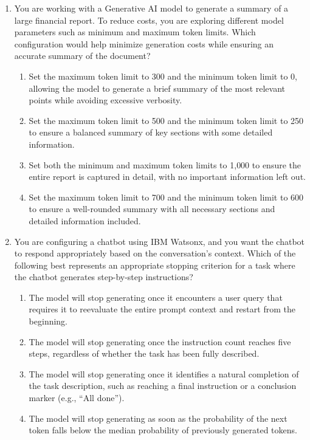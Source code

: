 \begin{enumerate}[leftmargin=*]
\begin{enumerate}[label=\Alph*.]
  \item Use simple, concise instructions that avoid ambiguity but ensure all necessary constraints are included.
  \item Focus on minimal prompts to reduce computational load, even if it sacrifices some clarity.
  \item Create longer, detailed prompts that cover all edge cases to reduce the need for multiple training iterations.
\end{enumerate}
\item You are working with a Generative AI model to generate a summary of a large financial report. To reduce costs, you are exploring different model parameters such as minimum and maximum token limits. Which configuration would help minimize generation costs while ensuring an accurate summary of the document?
\begin{enumerate}[label=\Alph*.]
  \item Set the maximum token limit to 300 and the minimum token limit to 0, allowing the model to generate a brief summary of the most relevant points while avoiding excessive verbosity.
  \item Set the maximum token limit to 500 and the minimum token limit to 250 to ensure a balanced summary of key sections with some detailed information.
  \item Set both the minimum and maximum token limits to 1{,}000 to ensure the entire report is captured in detail, with no important information left out.
  \item Set the maximum token limit to 700 and the minimum token limit to 600 to ensure a well-rounded summary with all necessary sections and detailed information included.
\end{enumerate}
\item You are configuring a chatbot using IBM Watsonx, and you want the chatbot to respond appropriately based on the conversation's context. Which of the following best represents an appropriate stopping criterion for a task where the chatbot generates step-by-step instructions?
\begin{enumerate}[label=\Alph*.]
  \item The model will stop generating once it encounters a user query that requires it to reevaluate the entire prompt context and restart from the beginning.
  \item The model will stop generating once the instruction count reaches five steps, regardless of whether the task has been fully described.
  \item The model will stop generating once it identifies a natural completion of the task description, such as reaching a final instruction or a conclusion marker (e.g., ``All done'').
  \item The model will stop generating as soon as the probability of the next token falls below the median probability of previously generated tokens.
\end{enumerate}
\end{enumerate}

